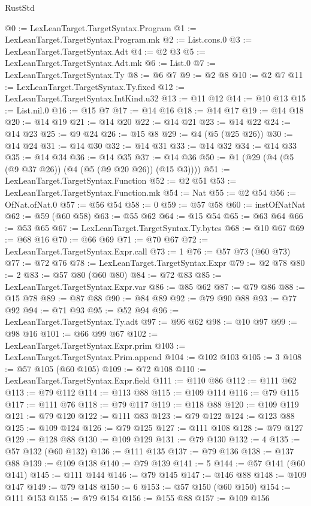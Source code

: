\begin{lexlean}{RustStd}
\begin{coremodule}
@0 := LexLeanTarget.TargetSyntax.Program
@1 := LexLeanTarget.TargetSyntax.Program.mk
@2 := List.cons.{0}
@3 := LexLeanTarget.TargetSyntax.Adt
@4 := @2 @3
@5 := LexLeanTarget.TargetSyntax.Adt.mk
@6 := List.{0}
@7 := LexLeanTarget.TargetSyntax.Ty
@8 := @6 @7
@9 := @2 @8
@10 := @2 @7
@11 := LexLeanTarget.TargetSyntax.Ty.fixed
@12 := LexLeanTarget.TargetSyntax.IntKind.u32
@13 := @11 @12
@14 := @10 @13
@15 := List.nil.{0}
@16 := @15 @7
@17 := @14 @16
@18 := @14 @17
@19 := @14 @18
@20 := @14 @19
@21 := @14 @20
@22 := @14 @21
@23 := @14 @22
@24 := @14 @23
@25 := @9 @24
@26 := @15 @8
@29 := @4 (@5 (@25 @26))
@30 := @14 @24
@31 := @14 @30
@32 := @14 @31
@33 := @14 @32
@34 := @14 @33
@35 := @14 @34
@36 := @14 @35
@37 := @14 @36
@50 := @1 (@29 (@4 (@5 (@9 @37 @26)) (@4 (@5 (@9 @20 @26)) (@15 @3))))
@51 := LexLeanTarget.TargetSyntax.Function
@52 := @2 @51
@53 := LexLeanTarget.TargetSyntax.Function.mk
@54 := Nat
@55 := @2 @54
@56 := OfNat.ofNat.{0}
@57 := @56 @54
@58 := 0
@59 := @57 @58
@60 := instOfNatNat
@62 := @59 (@60 @58)
@63 := @55 @62
@64 := @15 @54
@65 := @63 @64
@66 := @53 @65
@67 := LexLeanTarget.TargetSyntax.Ty.bytes
@68 := @10 @67
@69 := @68 @16
@70 := @66 @69
@71 := @70 @67
@72 := LexLeanTarget.TargetSyntax.Expr.call
@73 := 1
@76 := @57 @73 (@60 @73)
@77 := @72 @76
@78 := LexLeanTarget.TargetSyntax.Expr
@79 := @2 @78
@80 := 2
@83 := @57 @80 (@60 @80)
@84 := @72 @83
@85 := LexLeanTarget.TargetSyntax.Expr.var
@86 := @85 @62
@87 := @79 @86
@88 := @15 @78
@89 := @87 @88
@90 := @84 @89
@92 := @79 @90 @88
@93 := @77 @92
@94 := @71 @93
@95 := @52 @94
@96 := LexLeanTarget.TargetSyntax.Ty.adt
@97 := @96 @62
@98 := @10 @97
@99 := @98 @16
@101 := @66 @99 @67
@102 := LexLeanTarget.TargetSyntax.Expr.prim
@103 := LexLeanTarget.TargetSyntax.Prim.append
@104 := @102 @103
@105 := 3
@108 := @57 @105 (@60 @105)
@109 := @72 @108
@110 := LexLeanTarget.TargetSyntax.Expr.field
@111 := @110 @86
@112 := @111 @62
@113 := @79 @112
@114 := @113 @88
@115 := @109 @114
@116 := @79 @115
@117 := @111 @76
@118 := @79 @117
@119 := @118 @88
@120 := @109 @119
@121 := @79 @120
@122 := @111 @83
@123 := @79 @122
@124 := @123 @88
@125 := @109 @124
@126 := @79 @125
@127 := @111 @108
@128 := @79 @127
@129 := @128 @88
@130 := @109 @129
@131 := @79 @130
@132 := 4
@135 := @57 @132 (@60 @132)
@136 := @111 @135
@137 := @79 @136
@138 := @137 @88
@139 := @109 @138
@140 := @79 @139
@141 := 5
@144 := @57 @141 (@60 @141)
@145 := @111 @144
@146 := @79 @145
@147 := @146 @88
@148 := @109 @147
@149 := @79 @148
@150 := 6
@153 := @57 @150 (@60 @150)
@154 := @111 @153
@155 := @79 @154
@156 := @155 @88
@157 := @109 @156

\end{coremodule}
\end{lexlean}
